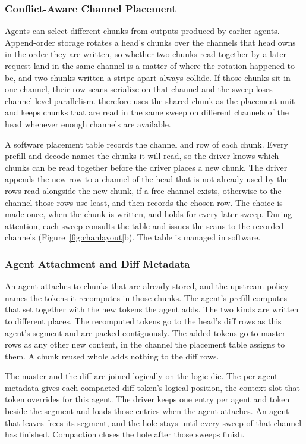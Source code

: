 \subsubsection{Conflict-Aware Channel Placement}
\label{sec:table}

Agents can select different chunks from outputs produced by
earlier agents.
Append-order storage rotates a head's chunks over the
channels that head owns in the order they are written, so
whether two chunks read together by a later request land in
the same channel is a matter of where the rotation happened
to be, and two chunks written a stripe apart always collide.
If those chunks sit in one channel, their row scans serialize
on that channel and the sweep loses channel-level
parallelism.
\Fugue{} therefore uses the shared chunk as the placement
unit and keeps chunks that are read in the same sweep on
different channels of the head whenever enough channels are
available.

A software placement table records the channel and row of
each chunk.
Every prefill and decode names the chunks it will read, so
the driver knows which chunks can be read together before the
driver places a new chunk.
The driver appends the new row to a channel of the head that
is not already used by the rows read alongside the new chunk,
if a free channel exists, otherwise to the channel those rows
use least, and then records the chosen row.
The choice is made once, when the chunk is written, and
holds for every later sweep.
During attention, each sweep consults the table and issues
the scans to the recorded channels
(Figure~\ref{fig:chanlayout}b).
The table is managed in software.

\subsubsection{Agent Attachment and Diff Metadata}
\label{sec:diff-metadata}

An agent attaches to chunks that are already stored, and the
upstream policy names the tokens it recomputes in those
chunks.
The agent's prefill computes that set together with the
new tokens the agent adds.
The two kinds are written to different places.
The recomputed tokens go to the head's diff rows as this
agent's segment and are packed contiguously.
The added tokens go to master rows as any other new content,
in the channel the placement table assigns to them.
A chunk reused whole adds nothing to the diff rows.

The master and the diff are joined logically on the logic
die.
The per-agent metadata gives each compacted diff token's
logical position, the context slot that token overrides
for this agent.
The driver keeps one entry per agent and token beside the
segment and loads those entries when the agent attaches.
An agent that leaves frees its segment, and the hole stays
until every sweep of that channel has finished.
Compaction closes the hole after those sweeps finish.

